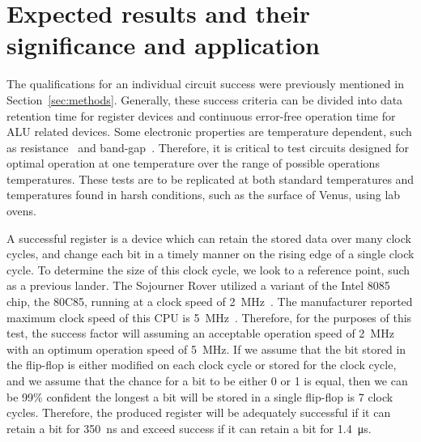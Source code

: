 \documentclass[12pt]{amsart}
\begin{document}
 	\section{Expected results and their significance and application}
 	\label{sec:results}
 	
	The qualifications for an individual circuit success were previously mentioned in Section~\ref{sec:methods}.  Generally, these success criteria can be divided into data retention time for register devices and continuous error-free operation time for ALU related devices.  Some electronic properties are temperature dependent, such as resistance~\cite{neudeck2016first} and band-gap~\cite{varshni_temperature_1967}.  Therefore, it is critical to test circuits designed for optimal operation at one temperature over the range of possible operations temperatures.  These tests are to be replicated at both standard temperatures and temperatures found in harsh conditions, such as the surface of Venus, using lab ovens.  
	
	A successful register is a device which can retain the stored data over many clock cycles, and change each bit in a timely manner on the rising edge of a single clock cycle.  To determine the size of this clock cycle, we look to a reference point, such as a previous lander.  The Sojourner Rover utilized a variant of the Intel 8085 chip, the 80C85, running at a clock speed of \SI{2}{\mega\hertz}~\cite{null_mars_1997}.  The manufacturer reported maximum clock speed of this CPU is \SI{5}{\mega\hertz}~\cite{oki_semiconductor_msm80c85ahrs/gs/js_1998}.  Therefore, for the purposes of this test, the success factor will assuming an acceptable operation speed of \SI{2}{\mega\hertz} with an optimum operation speed of \SI{5}{\mega\hertz}.  If we assume that the bit stored in the flip-flop is either modified on each clock cycle or stored for the clock cycle, and we assume that the chance for a bit to be either 0 or 1 is equal, then we can be 99\% confident the longest a bit will be stored in a single flip-flop is 7 clock cycles.  Therefore, the produced register will be adequately successful if it can retain a bit for \SI{350}{\nano\second} and exceed success if it can retain a bit for \SI{1.4}{\micro\second}.
	
\end{document}

